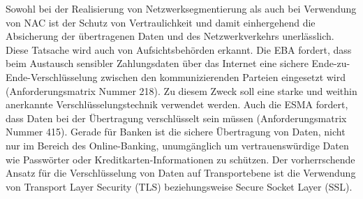 \bigbreak
Sowohl bei der Realisierung von Netzwerksegmentierung als auch bei Verwendung von NAC ist der Schutz von Vertraulichkeit und damit einhergehend die Absicherung der übertragenen Daten und des Netzwerkverkehrs unerlässlich. Diese Tatsache wird auch von Aufsichtsbehörden erkannt. Die EBA fordert, dass beim Austausch sensibler Zahlungsdaten über das Internet eine sichere Ende-zu-Ende-Verschlüsselung zwischen den kommunizierenden Parteien eingesetzt wird (Anforderungsmatrix Nummer 218). Zu diesem Zweck soll eine starke und weithin anerkannte Verschlüsselungstechnik verwendet werden. Auch die ESMA fordert, dass Daten bei der Übertragung verschlüsselt sein müssen (Anforderungsmatrix Nummer 415). Gerade für Banken ist die sichere Übertragung von Daten, nicht nur im Bereich des Online-Banking, unumgänglich um vertrauenswürdige Daten wie Passwörter oder Kreditkarten-Informationen zu schützen. Der vorherrschende Ansatz für die Verschlüsselung von Daten auf Transportebene ist die Verwendung von \glqq{}Transport Layer Security (TLS)\grqq{} beziehungsweise \glqq{}Secure Socket Layer (SSL)\grqq{}. \autocite{SchwenkJörg2020SuKi}

